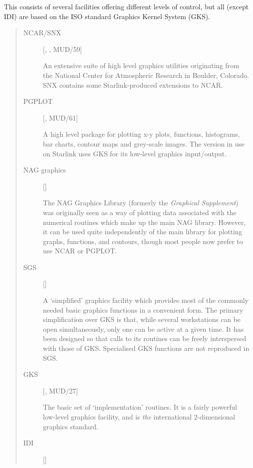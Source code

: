 This consists of several facilities offering different levels of control,
but all (except IDI) are based on the ISO standard Graphics Kernel System (GKS).

\begin{quote}
\begin{description}

\item [NCAR/SNX] \hfill [, , MUD/59]

 An extensive suite of high level graphics utilities originating from the
 National Center for Atmospheric Research in Boulder, Colorado.
 SNX contains some Starlink-produced extensions to NCAR.

\item [PGPLOT] \hfill [, MUD/61]

 A high level package for plotting x-y plots, functions, histograms, bar charts,
 contour maps and grey-scale images.
 The version in use on Starlink uses GKS for its low-level graphics
 input/output.

\item [NAG graphics] \hfill []

 The NAG Graphics Library (formerly the {\em Graphical Supplement}) was
 originally seen as a way of plotting data associated with the numerical
 routines which make up the main NAG library.
 However, it can be used quite independently of the main library for plotting
 graphs, functions, and contours, though most people now prefer to use NCAR
 or PGPLOT.

\item [SGS] \hfill []

 A `simplified' graphics facility which provides most of the commonly needed
 basic graphics functions in a convenient form.
 The primary simplification over GKS is that, while several workstations can
 be open simultaneously, only one can be active at a given time.
 It has been designed so that calls to its routines can be freely interspersed
 with those of GKS.
 Specialised GKS functions are not reproduced in SGS.

\item [GKS] \hfill [, MUD/27]

 The basic set of `implementation' routines.
 It is a fairly powerful low-level graphics facility, and is {\em the}
 international 2-dimensional graphics standard.

\item [IDI] \hfill []


\end{description}
\end{quote}
